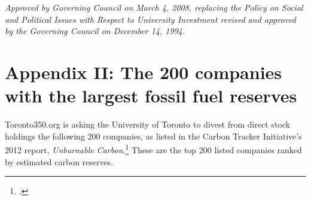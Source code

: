 \documentclass[10pt]{article}
\begin{document}
\emph{Approved by Governing Council on March 4, 2008, replacing the Policy on Social and Political Issues with Respect to University Investment revised and approved by the Governing Council on December 14, 1994.}







\clearpage



		\singlespacing
		\section {Appendix II: The 200 companies with the largest fossil fuel reserves}
		\label{sec:200Companies}
		\doublespacing



Toronto350.org is asking the University of Toronto to divest from direct stock holdings the following 200 companies, as listed in the Carbon Tracker Initiative's 2012 report, \emph{Unburnable Carbon}.\footcite{CTI2012} 
These are the top 200 listed companies ranked by estimated carbon reserves.
\end{document}
